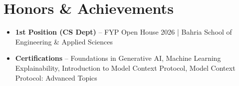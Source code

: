 \documentclass[11pt,a4paper]{article}
\begin{document}
\section*{Honors \& Achievements}

\begin{itemize}[leftmargin=1.5em,itemsep=0pt,topsep=1pt]
\item \textbf{1st Position (CS Dept)} -- FYP Open House 2026 | Bahria School of Engineering \& Applied Sciences
\item \textbf{Certifications} -- Foundations in Generative AI, Machine Learning Explainability,  Introduction to Model Context Protocol, Model Context Protocol: Advanced Topics
\end{itemize}
\end{document}
